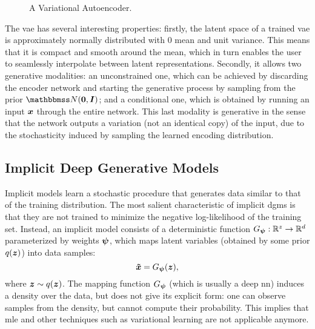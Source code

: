 \begin{figure*}[h!]
    \centering
    \resizebox{.75\textwidth}{!}{}
    \caption{A Variational Autoencoder.}
    \label{fig:vae}
\end{figure*}
The \gls{vae} has several interesting properties: firstly, the latent space of a trained \gls{vae} is approximately normally distributed with 0 mean and unit variance. This means that it is compact and smooth around the mean, which in turn enables the user to seamlessly interpolate between latent representations. Secondly, it allows two generative modalities: an unconstrained one, which can be achieved by discarding the encoder network and starting the generative process by sampling from the prior $\Normal{\Zeros}{\Identity}$; and a conditional one, which is obtained by running an input $\Vector{x}$ through the entire network. This last modality is generative in the sense that the network outputs a variation (not an identical copy) of the input, due to the stochasticity induced by sampling the learned encoding distribution.

\subsection{Implicit Deep Generative Models}
Implicit models \citep{mohamed2016implicitgan} learn a stochastic procedure that generates data similar to that of the training distribution. The most salient characteristic of implicit \glspl{dgm} is that they are not trained to minimize the negative log-likelihood of the training set. Instead, an implicit model consists of a deterministic  function $G_{\boldsymbol{\psi}}: \mathbb{R}^z \rightarrow \mathbb{R}^d$ parameterized by weights $\boldsymbol{\psi}$, which maps latent variables (obtained by some prior $q(\Vector{z})$) into data samples:
$$\Vector{\tilde{x}} = \Generator(\Vector{z}),$$
where $\Vector{z} \sim q(\Vector{z})$. The mapping function $G_{\boldsymbol{\psi}}$ (which is usually a deep \gls{nn}) induces a density over the data, but does not give its explicit form: one can observe samples from the density, but cannot compute their probability. This implies that \gls{mle} and other techniques such as variational learning are not applicable anymore.


